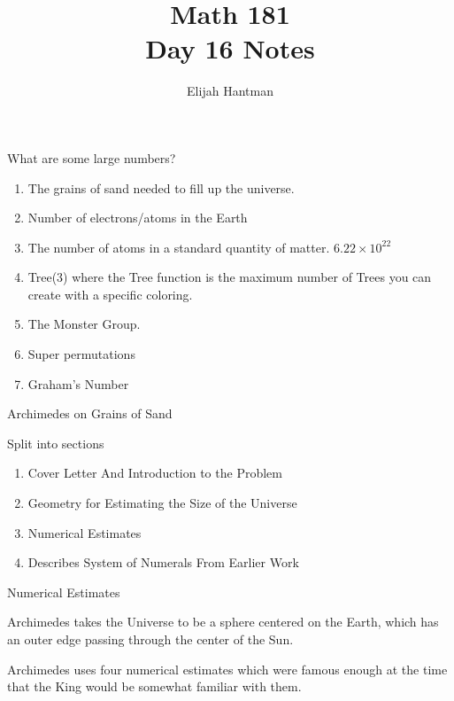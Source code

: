 \documentclass{report}
\title{\Huge{Math 181}\\Day 16 Notes}
\author{\huge{Elijah Hantman}}
\date{}
\begin{document}
\maketitle
\newpage

\begin{description}
    \item What are some large numbers? 
        \begin{enumerate}
            \item The grains of sand needed to fill up
                the universe.
            \item Number of electrons/atoms in the Earth
            \item The number of atoms in a standard
                quantity of matter. $6.22\times 10^{22}$
            \item Tree(3) where the Tree function is
                the maximum number of Trees you can create
                with a specific coloring.
            \item The Monster Group.
            \item Super permutations
            \item Graham's Number
        \end{enumerate}
    \item {\large Archimedes on Grains of Sand}
    \item Split into sections
        \begin{enumerate}
            \item Cover Letter And Introduction to the Problem
            \item Geometry for Estimating the Size of the Universe
            \item Numerical Estimates
            \item Describes System of Numerals From Earlier
                Work
        \end{enumerate}
    \item {\large Numerical Estimates}
        \begin{mdframed}
            Archimedes takes the Universe to be a sphere centered
            on the Earth, which has an outer edge passing through
            the center of the Sun.

            Archimedes uses four numerical estimates which were
            famous enough at the time that the King would be
            somewhat familiar with them.


\end{mdframed}
\end{description}
\end{document}
